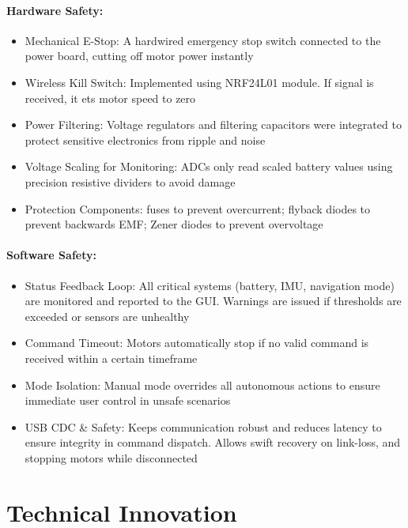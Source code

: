 \documentclass[12pt,a4paper,twocolumn]{article}
\begin{document}
\paragraph{Hardware Safety:}

\begin{itemize}
    \item Mechanical E-Stop: A hardwired emergency stop switch connected to the power board, cutting off motor power instantly
    \item Wireless Kill Switch: Implemented using NRF24L01 module. If signal is received, it ets motor speed to zero
    \item Power Filtering: Voltage regulators and filtering capacitors were integrated to protect sensitive electronics from ripple and noise
    \item Voltage Scaling for Monitoring: ADCs only read scaled battery values using precision resistive dividers to avoid damage
    \item Protection Components: fuses to prevent overcurrent; flyback diodes to prevent backwards EMF; Zener diodes to prevent overvoltage
\end{itemize}

\paragraph{Software Safety:}

\begin{itemize}
    \item Status Feedback Loop: All critical systems (battery, IMU, navigation mode) are monitored and reported to the GUI. Warnings are issued if thresholds are exceeded or sensors are unhealthy
    \item Command Timeout: Motors automatically stop if no valid command is received within a certain timeframe
    \item Mode Isolation: Manual mode overrides all autonomous actions to ensure immediate user control in unsafe scenarios
    \item USB CDC \& Safety: Keeps communication robust and reduces latency to ensure integrity in command dispatch. Allows swift recovery on link-loss, and stopping motors while disconnected
\end{itemize}

\section{Technical Innovation}
\end{document}
